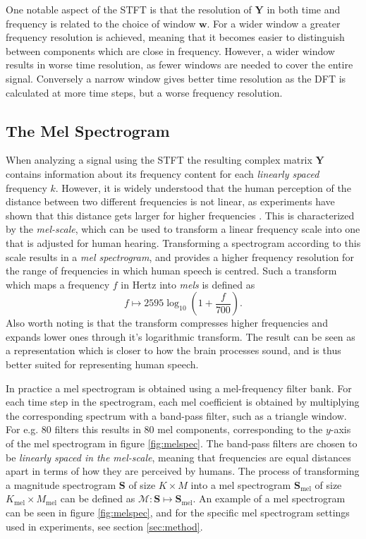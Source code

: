 \documentclass{report}
\begin{document}
One notable aspect of the STFT is that the resolution of $\bm{Y}$ in both time and frequency is related to the choice of window $\bm{w}$. For a wider window a greater frequency resolution is achieved, meaning that it becomes easier to distinguish between components which are close in frequency. However, a wider window results in worse time resolution, as fewer windows are needed to cover the entire signal. Conversely a narrow window gives better time resolution as the DFT is calculated at more time steps, but a worse frequency resolution.

\subsection{The Mel Spectrogram} \label{sec:melspec}
When analyzing a signal using the STFT the resulting complex matrix $\bm{Y}$ contains information about its frequency content for each \textit{linearly spaced} frequency $k$. However, it is widely understood that the human perception of the distance between two different frequencies is not linear, as experiments have shown that this distance gets larger for higher frequencies \cite{stevens1937scale}. This is characterized by the \textit{mel-scale}, which can be used to transform a linear frequency scale into one that is adjusted for human hearing. Transforming a spectrogram according to this scale results in a \textit{mel spectrogram}, and provides a higher frequency resolution for the range of frequencies in which human speech is centred. Such a transform which maps a frequency $f$ in Hertz into \textit{mels} is defined as
\begin{equation}
    f \longmapsto 2595 \log_{10} \left( 1 + \frac{f}{700} \right).
\end{equation}
Also worth noting is that the transform compresses higher frequencies and expands lower ones through it's logarithmic transform. The result can be seen as a representation which is closer to how the brain processes sound, and is thus better suited for representing human speech.

In practice a mel spectrogram is obtained using a mel-frequency filter bank. For each time step in the spectrogram, each mel coefficient is obtained by multiplying the corresponding spectrum with a band-pass filter, such as a triangle window. For e.g. 80 filters this results in 80 mel components, corresponding to the $y$-axis of the mel spectrogram in figure \ref{fig:melspec}. The band-pass filters are chosen to be \textit{linearly spaced in the mel-scale}, meaning that frequencies are equal distances apart in terms of how they are perceived by humans. The process of transforming a magnitude spectrogram $\bm{S}$ of size $K \times M$ into a mel spectrogram $\bm{S}_{\text{mel}}$ of size $K_{\text{mel}} \times M_{\text{mel}}$ can be defined as $\mathcal{M}: \bm{S} \mapsto \bm{S}_{\text{mel}}$. An example of a mel spectrogram can be seen in figure \ref{fig:melspec}, and for the specific mel spectrogram settings used in experiments, see section \ref{sec:method}.
\end{document}

